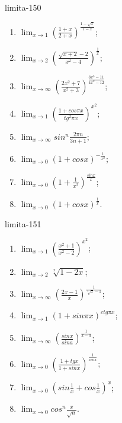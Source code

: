 \begin{defproblem}{limita-150}
\begin{multicols}{2}
\begin{enumerate}
    \item $\lim_{{x \rightarrow 1}} (\frac{1+x}{2+x})^{\frac{1-\sqrt{x}}{1-x}}$;
    \item $\lim_{{x \rightarrow 2}} (\frac{\sqrt{x+2}-2}{x^2-4})^{\frac{1}{x}}$;
    \item $\lim_{{x \rightarrow \infty}} (\frac{2x^2+7}{x^2+3})^{\frac{3x^3-11}{4x^2-12}}$;
    \item $\lim_{{x \rightarrow 1}} (\frac{1+cos \pi x}{tg ^2 \pi x})^{x^2}$;
    \item $\lim_{{x \rightarrow \infty}} sin ^n \frac{2 \pi n}{3n+1}$;
    \item $\lim_{{x \rightarrow 0}} (1+cos x)^{-\frac{1}{x^2}}$;
    \item $\lim_{{x \rightarrow 0}} (1+\frac{1}{x^2})^{\frac{sin x}{x}}$;
    \item $\lim_{{x \rightarrow 0}} (1+cos x)^{\frac{1}{x}}$.
\end{enumerate}
\end{multicols}
\end{defproblem}

\begin{defproblem}{limita-151}
\begin{multicols}{2}
\begin{enumerate}
    \item $\lim_{{x \rightarrow 1}} (\frac{x^2+1}{x^2-2})^{x^2}$;
    \item $\lim_{{x \rightarrow 2}} \sqrt[x]{1-2x}$;
    \item $\lim_{{x \rightarrow \infty}} (\frac{2x-1}{x})^{\frac{1}{\sqrt[3]{x}-1}}$;
    \item $\lim_{{x \rightarrow 1}} (1+sin \pi x)^{ctg \pi x}$;
    \item $\lim_{{x \rightarrow \infty}} (\frac{sin x}{sin a})^{\frac{1}{x-a}}$;
    \item $\lim_{{x \rightarrow 0}} (\frac{1+tg x}{1+sin x})^{\frac{1}{sin x}}$;
    \item $\lim_{{x \rightarrow 0}} (sin \frac{1}{x}+cos \frac{1}{x})^x$;
    \item $\lim_{{x \rightarrow 0}} cos ^n \frac{x}{\sqrt{n}}$.
\end{enumerate}
\end{multicols}
\end{defproblem}


